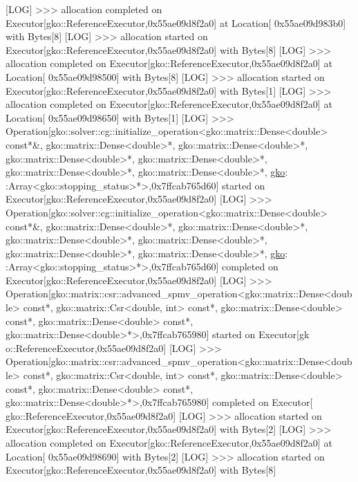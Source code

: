 \begin{DoxyCode}
                                                               
[LOG] >>> allocation completed on Executor[gko::ReferenceExecutor,0x55ae09d8f2a0] at Location[
      0x55ae09d983b0] with Bytes[8]
[LOG] >>> allocation started on Executor[gko::ReferenceExecutor,0x55ae09d8f2a0] with Bytes[8]
[LOG] >>> allocation completed on Executor[gko::ReferenceExecutor,0x55ae09d8f2a0] at Location[
      0x55ae09d98500] with Bytes[8]
[LOG] >>> allocation started on Executor[gko::ReferenceExecutor,0x55ae09d8f2a0] with Bytes[1]
[LOG] >>> allocation completed on Executor[gko::ReferenceExecutor,0x55ae09d8f2a0] at Location[
      0x55ae09d98650] with Bytes[1]
[LOG] >>> Operation[gko::solver::cg::initialize\_operation<gko::matrix::Dense<double> \textcolor{keyword}{const}*&, 
      gko::matrix::Dense<double>*, gko::matrix::Dense<double>*, gko::matrix::Dense<double>*, gko::matrix::Dense<double>*, 
      gko::matrix::Dense<double>*, gko::matrix::Dense<double>*, \hyperlink{namespacegko}{gko}:
:Array<gko::stopping\_status>*>,0x7ffcab765d60] started on Executor[gko::ReferenceExecutor,0x55ae09d8f2a0]
[LOG] >>> Operation[gko::solver::cg::initialize\_operation<gko::matrix::Dense<double> \textcolor{keyword}{const}*&, 
      gko::matrix::Dense<double>*, gko::matrix::Dense<double>*, gko::matrix::Dense<double>*, gko::matrix::Dense<double>*, 
      gko::matrix::Dense<double>*, gko::matrix::Dense<double>*, \hyperlink{namespacegko}{gko}:
:Array<gko::stopping\_status>*>,0x7ffcab765d60] completed on Executor[gko::ReferenceExecutor,0x55ae09d8f2a0]
[LOG] >>> Operation[gko::matrix::csr::advanced\_spmv\_operation<gko::matrix::Dense<double> \textcolor{keyword}{const}*, 
      gko::matrix::Csr<double, int> \textcolor{keyword}{const}*, gko::matrix::Dense<double> \textcolor{keyword}{const}*, gko::matrix::Dense<double> \textcolor{keyword}{const}*, 
      gko::matrix::Dense<double>*>,0x7ffcab765980] started on Executor[gk
o::ReferenceExecutor,0x55ae09d8f2a0]
[LOG] >>> Operation[gko::matrix::csr::advanced\_spmv\_operation<gko::matrix::Dense<double> \textcolor{keyword}{const}*, 
      gko::matrix::Csr<double, int> \textcolor{keyword}{const}*, gko::matrix::Dense<double> \textcolor{keyword}{const}*, gko::matrix::Dense<double> \textcolor{keyword}{const}*, 
      gko::matrix::Dense<double>*>,0x7ffcab765980] completed on Executor[
gko::ReferenceExecutor,0x55ae09d8f2a0]
[LOG] >>> allocation started on Executor[gko::ReferenceExecutor,0x55ae09d8f2a0] with Bytes[2]
[LOG] >>> allocation completed on Executor[gko::ReferenceExecutor,0x55ae09d8f2a0] at Location[
      0x55ae09d98690] with Bytes[2]
[LOG] >>> allocation started on Executor[gko::ReferenceExecutor,0x55ae09d8f2a0] with Bytes[8]

\end{DoxyCode}
